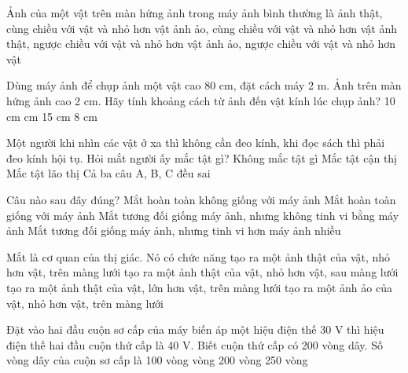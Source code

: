 \begin{ex}
	Ảnh của một vật trên màn hứng ảnh trong máy ảnh bình thường là
	\choice
	{ảnh thật, cùng chiều với vật và nhỏ hơn vật}
	{ảnh ảo, cùng chiều với vật và nhỏ hơn vật}
	{\True ảnh thật, ngược chiều với vật và nhỏ hơn vật}
	{ảnh ảo, ngược chiều với vật và nhỏ hơn vật}
	\loigiai{}
\end{ex}

\begin{ex}
	Dùng máy ảnh để chụp ảnh một vật cao 80 cm, đặt cách máy 2 m. Ảnh trên màn hứng ảnh cao 2 cm. Hãy tính khoảng cách từ ảnh đến vật kính lúc chụp ảnh?
	\choice
	{10 cm}
	{ cm}
	{15 cm}
	{8 cm}
	\loigiai{}
\end{ex}

\begin{ex}
	Một người khi nhìn các vật ở xa thì không cần đeo kính, khi đọc sách thì phải đeo kính hội tụ. Hỏi mắt người ấy mắc tật gì?
	\choice
	{Không mắc tật gì}
	{Mắc tật cận thị}
	{\True Mắc tật lão thị}
	{Cả ba câu A, B, C đều sai}
	\loigiai{}
\end{ex}

\begin{ex}
	Câu nào sau đây đúng?
	\choice
	{Mắt hoàn toàn không giống với máy ảnh}
	{Mắt hoàn toàn giống với máy ảnh}
	{Mắt tương đối giống máy ảnh, nhưng không tinh vi bằng máy ảnh}
	{\True Mắt tương đối giống máy ảnh, nhưng tinh vi hơn máy ảnh nhiều}
	\loigiai{}
\end{ex}

\begin{ex}
	Mắt là cơ quan của thị giác. Nó có chức năng
	\choice
	{\True tạo ra một ảnh thật của vật, nhỏ hơn vật, trên màng lưới}
	{tạo ra một ảnh thật của vật, nhỏ hơn vật, sau màng lưới}
	{tạo ra một ảnh thật của vật, lớn hơn vật, trên màng lưới}
	{tạo ra một ảnh ảo của vật, nhỏ hơn vật, trên màng lưới}
	\loigiai{}
\end{ex}

\begin{ex}
	Đặt vào hai đầu cuộn sơ cấp của máy biến áp một hiệu điện thế 30 V thì hiệu điện thế hai đầu cuộn thứ cấp là 40 V. Biết cuộn thứ cấp có 200 vòng dây. Số vòng dây của cuộn sơ cấp là
	\choice
	{100 vòng}
	{ vòng}
	{200 vòng}
	{250 vòng}
	\loigiai{}
\end{ex}

